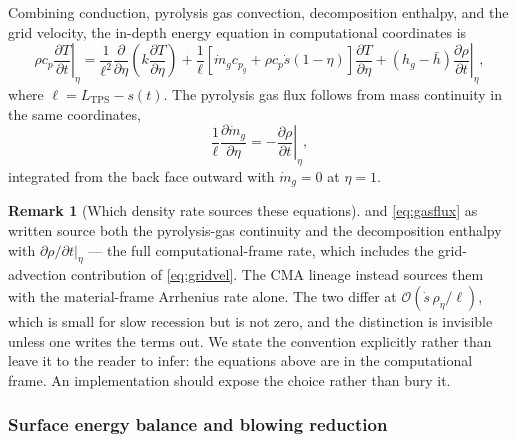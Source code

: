 \documentclass[11pt,a4paper]{article}
\theoremstyle{definition}
\newtheorem{remark}[theorem]{Remark}
\numberwithin{equation}{section}
\begin{document}
Combining conduction, pyrolysis gas convection, decomposition enthalpy, and the grid velocity, the in-depth energy equation in computational coordinates is
\begin{equation}
\label{eq:energy}
\rho c_p \left.\frac{\partial T}{\partial t}\right|_{\eta}
= \frac{1}{\ell^2}\frac{\partial}{\partial \eta}\!\left( k \frac{\partial T}{\partial \eta} \right)
+ \frac{1}{\ell}\left[ \dot{m}_g c_{p_g} + \rho c_p \dot{s}(1-\eta) \right] \frac{\partial T}{\partial \eta}
+ \left( h_g - \bar{h} \right) \left.\frac{\partial \rho}{\partial t}\right|_{\eta},
\end{equation}
where $\ell = L_{\text{TPS}} - s(t)$. The pyrolysis gas flux follows from mass continuity in the same coordinates,
\begin{equation}
\label{eq:gasflux}
\frac{1}{\ell}\frac{\partial \dot{m}_g}{\partial \eta} = -\left.\frac{\partial \rho}{\partial t}\right|_{\eta},
\end{equation}
integrated from the back face outward with $\dot{m}_g = 0$ at $\eta = 1$.

\begin{remark}[Which density rate sources these equations]
\label{rem:rateconvention}
 and \cref{eq:gasflux} as written source both the pyrolysis-gas continuity and the decomposition enthalpy with $\partial\rho/\partial t|_\eta$ --- the full computational-frame rate, which includes the grid-advection contribution of \cref{eq:gridvel}. The CMA lineage instead sources them with the material-frame Arrhenius rate alone. The two differ at $\mathcal{O}(\dot{s}\,\rho_\eta/\ell)$, which is small for slow recession but is not zero, and the distinction is invisible unless one writes the terms out. We state the convention explicitly rather than leave it to the reader to infer: the equations above are in the computational frame. An implementation should expose the choice rather than bury it.
\end{remark}

\subsubsection{Surface energy balance and blowing reduction}
\end{document}
